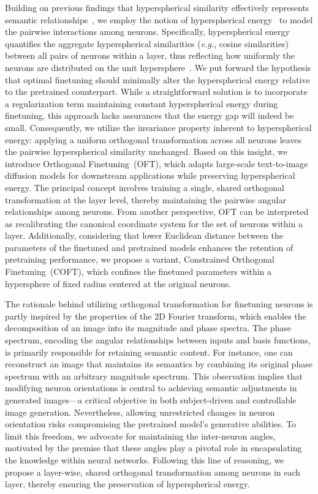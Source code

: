 Building on previous findings that hyperspherical similarity effectively represents semantic relationships~\cite{liu2017deep,liu2018decoupled,chen2020angular}, we employ the notion of hyperspherical energy~\cite{liu2018learning} to model the pairwise interactions among neurons. Specifically, hyperspherical energy quantifies the aggregate hyperspherical similarities (\emph{e.g.}, cosine similarities) between all pairs of neurons within a layer, thus reflecting how uniformly the neurons are distributed on the unit hypersphere~\cite{liu2021learning}. We put forward the hypothesis that optimal finetuning should minimally alter the hyperspherical energy relative to the pretrained counterpart. While a straightforward solution is to incorporate a regularization term maintaining constant hyperspherical energy during finetuning, this approach lacks assurances that the energy gap will indeed be small. Consequently, we utilize the invariance property inherent to hyperspherical energy: applying a uniform orthogonal transformation across all neurons leaves the pairwise hyperspherical similarity unchanged. Based on this insight, we introduce Orthogonal Finetuning~(OFT), which adapts large-scale text-to-image diffusion models for downstream applications while preserving hyperspherical energy. The principal concept involves training a single, shared orthogonal transformation at the layer level, thereby maintaining the pairwise angular relationships among neurons. From another perspective, OFT can be interpreted as recalibrating the canonical coordinate system for the set of neurons within a layer. Additionally, considering that lower Euclidean distance between the parameters of the finetuned and pretrained models enhances the retention of pretraining performance, we propose a variant, Constrained Orthogonal Finetuning~(COFT), which confines the finetuned parameters within a hypersphere of fixed radius centered at the original neurons.

The rationale behind utilizing orthogonal transformation for finetuning neurons is partly inspired by the properties of the 2D Fourier transform, which enables the decomposition of an image into its magnitude and phase spectra. The phase spectrum, encoding the angular relationships between inputs and basis functions, is primarily responsible for retaining semantic content. For instance, one can reconstruct an image that maintains its semantics by combining its original phase spectrum with an arbitrary magnitude spectrum. This observation implies that modifying neuron orientations is central to achieving semantic adjustments in generated images—a critical objective in both subject-driven and controllable image generation. Nevertheless, allowing unrestricted changes in neuron orientation risks compromising the pretrained model’s generative abilities. To limit this freedom, we advocate for maintaining the inter-neuron angles, motivated by the premise that these angles play a pivotal role in encapsulating the knowledge within neural networks. Following this line of reasoning, we propose a layer-wise, shared orthogonal transformation among neurons in each layer, thereby ensuring the preservation of hyperspherical energy.

